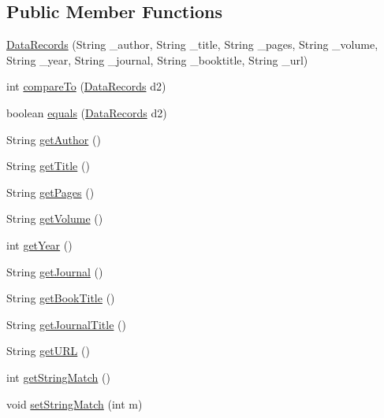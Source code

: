 \subsection*{Public Member Functions}
\begin{DoxyCompactItemize}
\item 
\hyperlink{classDataRecords_a793695c48b7a584d447facf8a0f36bbb}{Data\+Records} (String \+\_\+author, String \+\_\+title, String \+\_\+pages, String \+\_\+volume, String \+\_\+year, String \+\_\+journal, String \+\_\+booktitle, String \+\_\+url)
\item 
int \hyperlink{classDataRecords_a94e4170d60a20f3ccbe9ca53b69decef}{compare\+To} (\hyperlink{classDataRecords}{Data\+Records} d2)
\item 
boolean \hyperlink{classDataRecords_ad01e27f88e67399ad7a861616b65c523}{equals} (\hyperlink{classDataRecords}{Data\+Records} d2)
\item 
String \hyperlink{classDataRecords_a9b0dba84ec8d539395853caff7d4080f}{get\+Author} ()
\item 
String \hyperlink{classDataRecords_a2b6d27b078eb3a16734562f9ded6e1c6}{get\+Title} ()
\item 
String \hyperlink{classDataRecords_a484260b5897ee754d22bdb1e0b1a4d69}{get\+Pages} ()
\item 
String \hyperlink{classDataRecords_a6dfac293f0bd901eebf3a6ae17dc2513}{get\+Volume} ()
\item 
int \hyperlink{classDataRecords_a9918de1a257be6b753ef46d66c43989c}{get\+Year} ()
\item 
String \hyperlink{classDataRecords_aab28a326b036a7f0a8c041419c1c2382}{get\+Journal} ()
\item 
String \hyperlink{classDataRecords_a4c25863961be4da93a129474387c4f41}{get\+Book\+Title} ()
\item 
String \hyperlink{classDataRecords_add5c32b5a1511c42f70846fe08a4cfd7}{get\+Journal\+Title} ()
\item 
String \hyperlink{classDataRecords_a40351f370945cfa624e1e3e1d6addc3e}{get\+U\+RL} ()
\item 
int \hyperlink{classDataRecords_a7487a30fa32c0f7e8a05f26b6f23f25a}{get\+String\+Match} ()
\item 
void \hyperlink{classDataRecords_a1e41c4c115595d47b7bbf4016919ff8c}{set\+String\+Match} (int m)
\end{DoxyCompactItemize}
